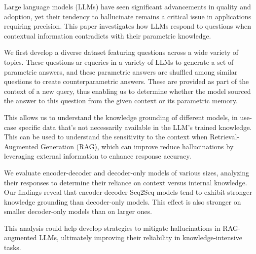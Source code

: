 Large language models (LLMs) have seen significant advancements in quality and adoption, yet their tendency to hallucinate remains a critical issue in applications requiring precision.
This paper investigates how LLMs respond to questions when contextual information contradicts with their parametric knowledge.

We first develop a diverse dataset featuring questions across a wide variety of topics.
These questions ar equeries in a variety of LLMs to generate a set of parametric answers, and these parametric answers are shuffled among similar questions to create counterparametric answers.
These are provided as part of the context of a new query, thus enabling us to determine whether the model sourced the answer to this question from the given context or its parametric memory.

This allows us to understand the knowledge grounding of different models, in use-case specific data that's not necessarily available in the LLM's trained knowledge.
This can be used to understand the sensitivity to the context when Retrieval-Augmented Generation (RAG), which can improve reduce hallucinations by leveraging external information to enhance response accuracy.

We evaluate encoder-decoder and decoder-only models of various sizes, analyzing their responses to determine their reliance on context versus internal knowledge.
Our findings reveal that encoder-decoder Seq2Seq models tend to exhibit stronger knowledge grounding than decoder-only models.
This effect is also stronger on smaller decoder-only models than on larger ones.

This analysis could help develop strategies to mitigate hallucinations in RAG-augmented LLMs, ultimately improving their reliability in knowledge-intensive tasks.
